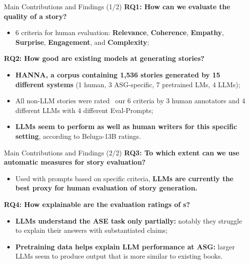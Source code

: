\begin{frame}{Main Contributions and Findings (1/2)}
    \textbf{RQ1: How can we evaluate the quality of a story?}
    \begin{itemize}
        \item 6 criteria for human evaluation: \textbf{Relevance}, \textbf{Coherence}, \textbf{Empathy}, \textbf{Surprise}, \textbf{Engagement}, and \textbf{Complexity};
    \end{itemize}
    \textbf{RQ2: How good are existing models at generating stories?}
    \begin{itemize}
        \item \textbf{HANNA, a corpus containing 1,536 stories generated by 15 different systems} (1 human, 3 ASG-specific, 7 pretrained LMs, 4 LLMs);
        \item All non-LLM stories were rated \wrt\ our 6 criteria by 3 human annotators and 4 different LLMs with 4 different Eval-Prompts;
        \item \textbf{LLMs seem to perform as well as human writers for this specific setting}, according to Beluga-13B ratings.
    \end{itemize}
\end{frame}

\begin{frame}{Main Contributions and Findings (2/2)}
    \textbf{RQ3: To which extent can we use automatic measures for story evaluation?}
    \begin{itemize}
        \item Used with prompts based on specific criteria, \textbf{LLMs are currently the best proxy for human evaluation of story generation.}
    \end{itemize}
    \textbf{RQ4: How explainable are the evaluation ratings of {\llm}s?}
\begin{itemize}
    \item \textbf{LLMs understand the ASE task only partially:} notably they struggle to explain their answers with substantiated claims;
    \item \textbf{Pretraining data helps explain LLM performance at ASG:} larger LLMs seem to produce output that is more similar to existing books.
\end{itemize}
\end{frame}

